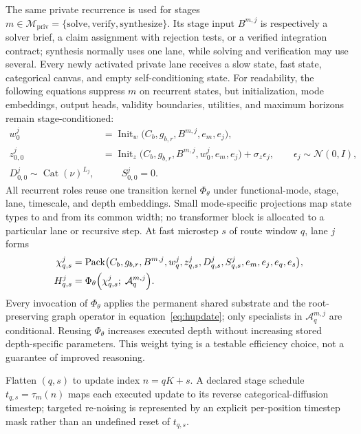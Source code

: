 \documentclass[10pt,a4paper]{article}
\newcommand{\op}[1]{\operatorname{#1}}
\newcommand{\Acal}{\mathcal{A}}
\begin{document}
The same private recurrence is used for stages
$m \in \mathcal{M}_{\mathrm{priv}} = \{\text{solve}, \text{verify},
\text{synthesize}\}$. Its stage input $B^{m,j}$ is respectively a solver
brief, a claim assignment with rejection tests, or a verified integration
contract; synthesis normally uses one lane, while solving and verification may
use several. Every newly activated private lane receives a slow state, fast
state, categorical canvas, and empty self-conditioning state. For readability,
the following equations suppress $m$ on recurrent states, but initialization,
mode embeddings, output heads, validity boundaries, utilities, and maximum
horizons remain stage-conditioned:
\begin{align}
w^j_0 &= \op{Init}_w\bigl( C_b, g_{b,r}, B^{m,j}, e_m, e_j \bigr), \\
z^j_{0,0} &= \op{Init}_z\bigl( C_b, g_{b,r}, B^{m,j}, w^j_0, e_m, e_j \bigr)
  + \sigma_z \epsilon_j, \qquad \epsilon_j \sim \mathcal{N}(0, I), \\
D^j_{0,0} \sim \op{Cat}(\nu)^{L_j}, &\qquad S^j_{0,0} = 0 .
\end{align}
All recurrent roles reuse one transition kernel $\Phi_\theta$ under
functional-mode, stage, lane, timescale, and depth embeddings. Small
mode-specific projections map state types to and from its common width; no
transformer block is allocated to a particular lane or recursive step. At fast
microstep $s$ of route window $q$, lane $j$ forms
\begin{align}
\chi^j_{q,s} &= \op{Pack}\bigl( C_b, g_{b,r}, B^{m,j}, w^j_q, z^j_{q,s},
  D^j_{q,s}, S^j_{q,s}, e_m, e_j, e_q, e_s \bigr), \\
H^j_{q,s} &= \Phi_\theta\Bigl( \chi^j_{q,s};\; \Acal^{m,j}_q \Bigr).
\end{align}
Every invocation of $\Phi_\theta$ applies the permanent shared substrate and
the root-preserving graph operator in equation~\eqref{eq:hupdate}; only
specialists in $\Acal^{m,j}_q$ are conditional. Reusing $\Phi_\theta$
increases executed depth without increasing stored depth-specific parameters.
This weight tying is a testable efficiency choice, not a guarantee of improved
reasoning.

Flatten $(q, s)$ to update index $n = qK + s$. A declared stage schedule
$t_{q,s} = \tau_m(n)$ maps each executed update to its reverse
categorical-diffusion timestep; targeted re-noising is represented by an
explicit per-position timestep mask rather than an undefined reset of
$t_{q,s}$.
\end{document}
